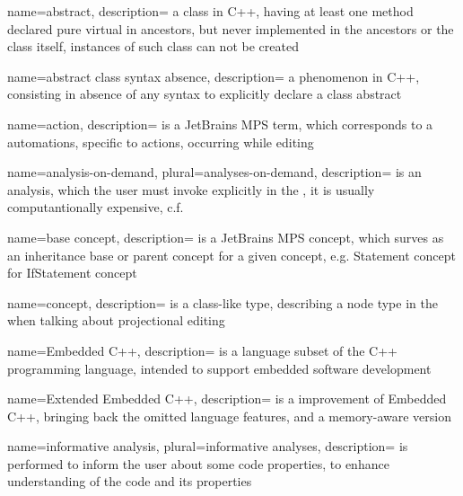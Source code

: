 {
  name=abstract,
  description={ a class in C++, having at least one method declared pure virtual in ancestors, but never implemented in the ancestors or the
  class itself, instances of such class can not be created}
}

{
  name=abstract class syntax absence,
  description={ a phenomenon in C++, consisting in absence of any syntax to explicitly declare a class abstract}
}

{
  name=action,
  description={ is a JetBrains MPS term, which corresponds to a automations, specific to actions, occurring while editing}
}




{
  name=analysis-on-demand,
  plural=analyses-on-demand,
  description={ is an analysis, which the user must invoke explicitly in the , it is usually computantionally expensive, c.f.  }
}




{
  name=base concept,
  description={ is a JetBrains MPS concept, which surves as an inheritance base or parent concept for a given concept, e.g. Statement concept for IfStatement concept}
}


{
  name=concept,
  description={ is a class-like type, describing a node type in the  when talking about projectional editing}
}




{
  name=Embedded C++,
  description={ is a language subset of the C++ programming language, intended to
  support embedded software development}
}

{
  name=Extended Embedded C++,
  description={ is a improvement of Embedded C++, bringing back the omitted language features, and a memory-aware  version}
}

{
  name=informative analysis,
  plural=informative analyses,
  description={ is performed to inform the user about some code properties, to enhance understanding of the code and its properties}
}


